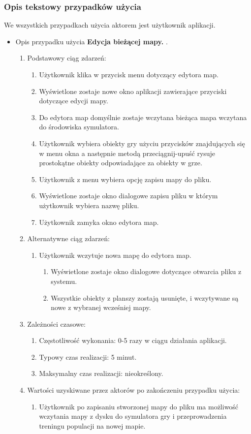 \subsubsection{Opis tekstowy przypadków użycia}
\begin{par}
	We wszystkich przypadkach użycia aktorem jest użytkownik aplikacji.
	\begin{itemize}

	\item
	Opis przypadku użycia {\bf Edycja bieżącej mapy. }.
	\begin{enumerate}
	\item Podstawowy ciąg zdarzeń:
		\begin{enumerate}
		\item Użytkownik klika w przycisk menu dotyczący edytora map.
		\item Wyświetlone zostaje nowe okno aplikacji zawierające przyciski dotyczące edycji mapy.
		\item Do edytora map domyślnie zostaje wczytana bieżąca mapa wczytana do środowiska symulatora.
		\item Użytkownik wybiera obiekty gry użyciu przycisków znajdujących się w menu okna a następnie metodą przeciągnij-upuść rysuje prostokątne obiekty odpowiadające za obiekty w grze.
		\item Użytkownik z menu wybiera opcję zapisu mapy do pliku.
		\item Wyświetlone zostaje okno dialogowe zapisu pliku w którym użytkownik wybiera nazwę pliku.
		\item Użytkownik zamyka okno edytora map.
		\end{enumerate}
	\item Alternatywne ciąg zdarzeń:
		\begin{enumerate}
		\item Użytkownik wczytuje nowa mapę do edytora map. 
			\begin{enumerate}
			\item Wyświetlone zostaje okno dialogowe dotyczące otwarcia pliku z systemu.
			\item Wszystkie obiekty z planszy zostają usunięte, i wczytywane są nowe z wybranej wcześniej mapy.
			\end{enumerate}
		\end{enumerate}
	\item Zależności czasowe:
		\begin{enumerate}
		\item Częstotliwość wykonania: 0-5 razy w ciągu działania aplikacji.
		\item Typowy czas realizacji: 5 minut.
		\item Maksymalny czas realizacji: nieokreślony.
		\end{enumerate}
	\item Wartości uzyskiwane przez aktorów po zakończeniu przypadku użycia:
		\begin{enumerate}
		\item Użytkownik po zapisaniu stworzonej mapy do pliku ma możliwość wczytania mapy z dysku do symulatora gry i przeprowadzenia treningu populacji na nowej mapie.
		\end{enumerate}
	\end{enumerate}


\end{itemize}
\end{par}
